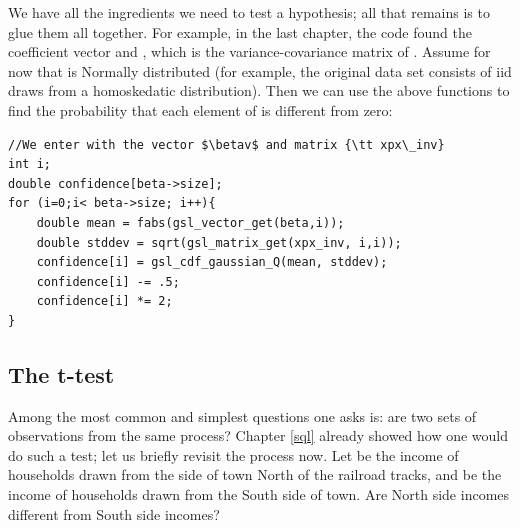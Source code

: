 We have all the ingredients we need to test a hypothesis; all that
remains is to glue them all together. For example, in the last chapter, the code
found the coefficient vector  and , which is the
variance-covariance matrix of .  Assume for now that 
is Normally distributed (for example, the original data set consists
of iid draws from a homoskedatic distribution). Then we can use the
above functions to find the probability that each element of 
is different from zero:

\lstset{texcl=true} \label{normalassumption} 
\begin{lstlisting}
//We enter with the vector $\betav$ and matrix {\tt xpx\_inv}
int i;
double confidence[beta->size];
for (i=0;i< beta->size; i++){
    double mean = fabs(gsl_vector_get(beta,i));
    double stddev = sqrt(gsl_matrix_get(xpx_inv, i,i));
    confidence[i] = gsl_cdf_gaussian_Q(mean, stddev);
    confidence[i] -= .5;
    confidence[i] *= 2;
}
\end{lstlisting}
\lstset{texcl=false}


\subsection{The t-test} \label{ttest} 
Among the most common and simplest questions one asks is: are two 
sets of observations from the same process? Chapter \ref{sql} already showed how one
would do such a test; let us briefly revisit the process now.
Let  be the income of households
drawn from the side of town North of the railroad tracks, and
 be the income of households drawn from the South side of
town. Are North side incomes different from South side incomes? 

